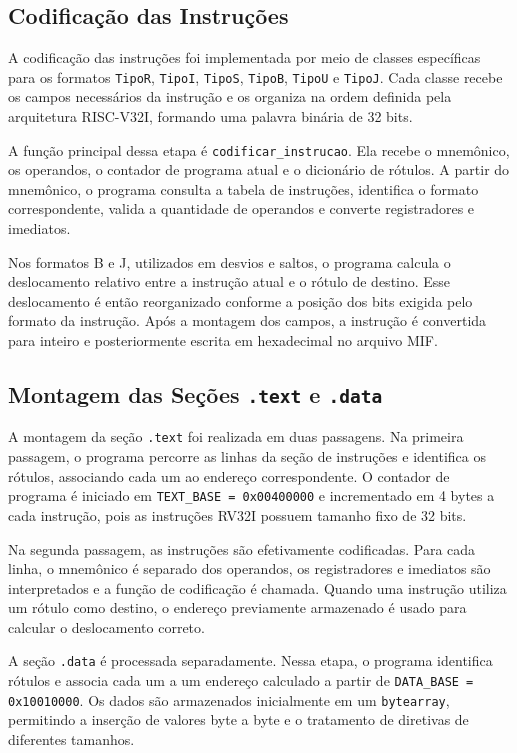 \documentclass[conference]{IEEEtran}
\begin{document}
\subsection{Codificação das Instruções}

A codificação das instruções foi implementada por meio de classes específicas para os formatos \texttt{TipoR}, \texttt{TipoI}, \texttt{TipoS}, \texttt{TipoB}, \texttt{TipoU} e \texttt{TipoJ}. Cada classe recebe os campos necessários da instrução e os organiza na ordem definida pela arquitetura RISC-V32I, formando uma palavra binária de 32 bits.

A função principal dessa etapa é \texttt{codificar\_instrucao}. Ela recebe o mnemônico, os operandos, o contador de programa atual e o dicionário de rótulos. A partir do mnemônico, o programa consulta a tabela de instruções, identifica o formato correspondente, valida a quantidade de operandos e converte registradores e imediatos.

Nos formatos B e J, utilizados em desvios e saltos, o programa calcula o deslocamento relativo entre a instrução atual e o rótulo de destino. Esse deslocamento é então reorganizado conforme a posição dos bits exigida pelo formato da instrução. Após a montagem dos campos, a instrução é convertida para inteiro e posteriormente escrita em hexadecimal no arquivo MIF.

\subsection{Montagem das Seções \texttt{.text} e \texttt{.data}}

A montagem da seção \texttt{.text} foi realizada em duas passagens. Na primeira passagem, o programa percorre as linhas da seção de instruções e identifica os rótulos, associando cada um ao endereço correspondente. O contador de programa é iniciado em \texttt{TEXT\_BASE = 0x00400000} e incrementado em 4 bytes a cada instrução, pois as instruções RV32I possuem tamanho fixo de 32 bits.

Na segunda passagem, as instruções são efetivamente codificadas. Para cada linha, o mnemônico é separado dos operandos, os registradores e imediatos são interpretados e a função de codificação é chamada. Quando uma instrução utiliza um rótulo como destino, o endereço previamente armazenado é usado para calcular o deslocamento correto.

A seção \texttt{.data} é processada separadamente. Nessa etapa, o programa identifica rótulos e associa cada um a um endereço calculado a partir de \texttt{DATA\_BASE = 0x10010000}. Os dados são armazenados inicialmente em um \texttt{bytearray}, permitindo a inserção de valores byte a byte e o tratamento de diretivas de diferentes tamanhos.
\end{document}
